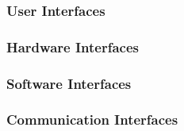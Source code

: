 
\subsubsection{User Interfaces}

\subsubsection{Hardware Interfaces}

\subsubsection{Software Interfaces}

\subsubsection{Communication Interfaces}
